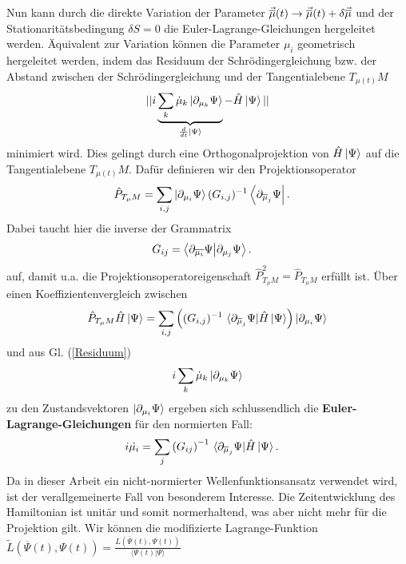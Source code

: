 Nun kann durch die direkte Variation der Parameter $\vec{\overline{\mu}}(t)\rightarrow \vec{\overline{\mu}}(t) + \delta\vec{\overline{\mu}}$ und der Stationaritätsbedingung 
$\delta S = 0$ die Euler-Lagrange-Gleichungen hergeleitet werden. Äquivalent zur Variation können die Parameter $\mu_i$ geometrisch hergeleitet
werden, indem das Residuum der Schrödingergleichung bzw. der Abstand zwischen der Schrödingergleichung und der Tangentialebene $T_{\mu(t)}M$ 
\begin{align}\label{Residuum}
    || i\underbrace{\sum_k \dot{\mu}_k\ket{\partial_{\mu_k}\Psi}}_{\frac{d}{dt}\ket{\Psi}} - \hat{H}\ket{\Psi} || 
\end{align}
minimiert wird. Dies gelingt durch eine Orthogonalprojektion von $\hat{H}\ket{\Psi}$ auf die Tangentialebene $T_{\mu(t)}M$. Dafür definieren wir den 
Projektionsoperator
\begin{align}
    \hat{P}_{T_{\mu}M} &= \sum_{i,j}\ket{\partial_{\mu_i}\Psi}(G_{i,j})^{-1}\bra{\partial_{\overline{\mu}_j}\Psi}.
\end{align}
Dabei taucht hier die inverse der Grammatrix 
\begin{align}
    G_{ij} &= \bra{\partial_{\overline{\mu_i}}\Psi}\ket{\partial_{\mu_j}\Psi}. 
\end{align}
auf, damit u.a. die Projektionsoperatoreigenschaft $\hat{P}_{T_{\mu}M}^2=\hat{P}_{T_{\mu}M}$ 
erfüllt ist. Über einen Koeffizientenvergleich zwischen
\begin{align}
    \hat{P}_{T_{\mu}M}\hat{H}\ket{\Psi} = \sum_{i,j}\left((G_{i,j})^{-1}\ 
    \langle\partial_{\muk_j}\Psi|\hat{H}\ket{\Psi}\right)\ket{\partial_{\mu_i}\Psi}
\end{align} 
und aus Gl. (\ref{Residuum})
\begin{align}
    i\sum_k \dot{\mu}_k\ket{\partial_{\mu_k}\Psi}
\end{align}
zu den Zustandsvektoren $\ket{\partial_{\mu_i}\Psi}$ ergeben sich schlussendlich die \textbf{Euler-Lagrange-Gleichungen} für den normierten Fall:
\begin{align}
    i\dot{\mu_i} &= \sum_{j}\left(G_{ij}\right)^{-1}\thinspace \langle\partial_{\overline{\mu}_j}\Psi|\hat{H}\ket{\Psi}.
\end{align}
Da in dieser Arbeit ein nicht-normierter Wellenfunktionsansatz verwendet wird, ist der verallgemeinerte Fall von besonderem Interesse. Die Zeitentwicklung
des Hamiltonian ist unitär und somit normerhaltend, was aber nicht mehr für die Projektion gilt. Wir
können die modifizierte Lagrange-Funktion $\widetilde{L}(\overline{\Psi}(t), \Psi(t)) = \frac{L(\overline{\Psi}(t), \Psi(t))}{\langle \Psi(t)|\Psi\rangle}$
